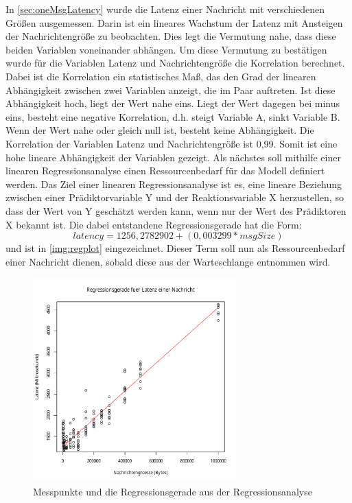 In \autoref{sec:oneMsgLatency} wurde die Latenz einer Nachricht mit verschiedenen Größen ausgemessen. Darin ist ein lineares Wachstum der Latenz mit Ansteigen der Nachrichtengröße zu beobachten. Dies legt die Vermutung nahe, dass diese beiden Variablen voneinander abhängen. Um diese Vermutung zu bestätigen wurde für die Variablen Latenz und Nachrichtengröße die Korrelation berechnet. Dabei ist die Korrelation ein statistisches Maß, das den Grad der linearen Abhängigkeit zwischen zwei Variablen anzeigt, die im Paar auftreten. Ist diese Abhängigkeit hoch, liegt der Wert nahe eins. Liegt der Wert dagegen bei minus eins, besteht eine negative Korrelation, d.h. steigt Variable A, sinkt Variable B. Wenn der Wert nahe oder gleich null ist, besteht keine Abhängigkeit. Die Korrelation der Variablen Latenz und Nachrichtengröße ist 0,99. Somit ist eine hohe lineare Abhängigkeit der Variablen gezeigt. Als nächstes soll mithilfe einer linearen Regressionsanalyse einen Ressourcenbedarf für das Modell definiert werden. Das Ziel einer linearen Regressionsanalyse ist es, eine lineare Beziehung zwischen einer Prädiktorvariable Y und der Reaktionsvariable X herzustellen, so dass der Wert von Y geschätzt werden kann, wenn nur der Wert des Prädiktoren X bekannt ist. Die dabei entstandene Regressionsgerade hat die Form: \[latency = 1256,2782902 + (0,003299 * msgSize)\] und ist in \autoref{img:regplot} eingezeichnet. Dieser Term soll nun als Ressourcenbedarf einer Nachricht dienen, sobald diese aus der Warteschlange entnommen wird. 
\begin{figure}
\center
  \includegraphics[width=0.7\textwidth]{images/modelling/oneMsgRegression.pdf}
  \caption{Messpunkte und die Regressionsgerade aus der Regressionsanalyse}
  \label{img:regplot}
\end{figure}

